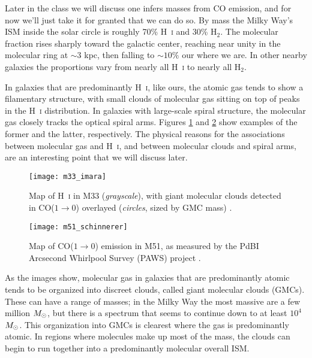 Later in the class we will discuss one infers masses from CO emission, and for now we'll just take it for granted that we can do so. By mass the Milky Way's ISM inside the solar circle is roughly 70\% H~\textsc{i} and 30\% H$_2$. The molecular fraction rises sharply toward the galactic center, reaching near unity in the molecular ring at $\sim 3$ kpc, then falling to $\sim 10\%$ our where we are. In other nearby galaxies the proportions vary from nearly all H~\textsc{i} to nearly all H$_2$.

In galaxies that are predominantly H~\textsc{i}, like ours, the atomic gas tends to show a filamentary structure, with small clouds of molecular gas sitting on top of peaks in the H~\textsc{i} distribution. In galaxies with large-scale spiral structure, the molecular gas closely tracks the optical spiral arms. Figures \ref{fig:m33_imara} and \ref{fig:m51_schinnerer} show examples of the former and the latter, respectively. The physical reasons for the associations between molecular gas and H~\textsc{i}, and between molecular clouds and spiral arms, are an interesting point that we will discuss later. 

\begin{figure}
\texttt{[image: m33\_imara]}
\caption[Distribution of H~\textsc{i} and GMCs in M33]{
\label{fig:m33_imara}
Map of H~\textsc{i} in M33 (\textit{grayscale}), with giant molecular clouds detected in CO($1\rightarrow 0$) overlayed (\textit{circles}, sized by GMC mass) \citep{imara11b}.
}
\end{figure}

\begin{figure}
\texttt{[image: m51\_schinnerer]}
\caption[Distribution of CO($1\rightarrow 0$) emission in M51]{
\label{fig:m51_schinnerer}
Map of CO($1\rightarrow 0$) emission in M51, as measured by the PdBI Arcsecond Whirlpool Survey (PAWS) project \citep{schinnerer13a}.
}
\end{figure}

As the images show, molecular gas in galaxies that are predominantly atomic tends to be organized into discreet clouds, called giant molecular clouds (GMCs). These can have a range of masses; in the Milky Way the most massive are a few million $M_{\odot}$, but there is a spectrum that seems to continue down to at least $10^4$ $M_{\odot}$. This organization into GMCs is clearest where the gas is predominantly atomic. In regions where molecules make up most of the mass, the clouds can begin to run together into a predominantly molecular overall ISM.

